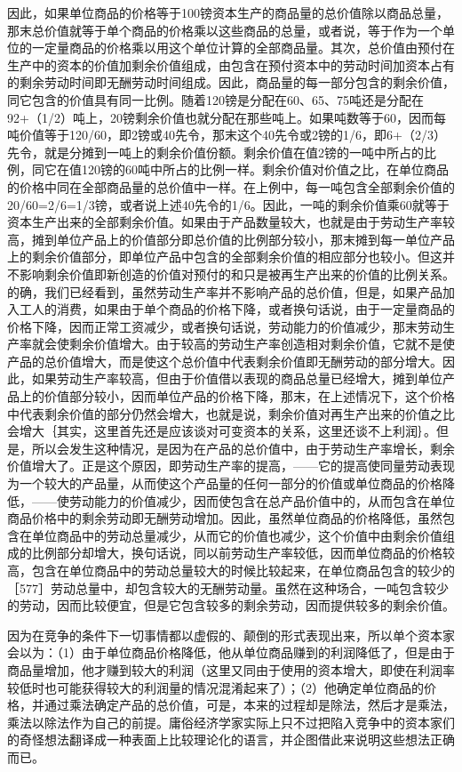 因此，如果单位商品的价格等于100镑资本生产的商品量的总价值除以商品总量，那末总价值就等于单个商品的价格乘以这些商品的总量，或者说，等于作为一个单位的一定量商品的价格乘以用这个单位计算的全部商品量。其次，总价值由预付在生产中的资本的价值加剩余价值组成，由包含在预付资本中的劳动时间加资本占有的剩余劳动时间即无酬劳动时间组成。因此，商品量的每一部分包含的剩余价值，同它包含的价值具有同一比例。随着120镑是分配在60、65、75吨还是分配在92+（1/2）吨上，20镑剩余价值也就分配在那些吨上。如果吨数等于60，因而每吨价值等于120/60，即2镑或40先令，那末这个40先令或2镑的1/6，即6+（2/3）先令，就是分摊到一吨上的剩余价值份额。剩余价值在值2镑的一吨中所占的比例，同它在值120镑的60吨中所占的比例一样。剩余价值对价值之比，在单位商品的价格中同在全部商品量的总价值中一样。在上例中，每一吨包含全部剩余价值的20/60=2/6=1/3镑，或者说上述40先令的1/6。因此，一吨的剩余价值乘60就等于资本生产出来的全部剩余价值。如果由于产品数量较大，也就是由于劳动生产率较高，摊到单位产品上的价值部分即总价值的比例部分较小，那末摊到每一单位产品上的剩余价值部分，即单位产品中包含的全部剩余价值的相应部分也较小。但这并不影响剩余价值即新创造的价值对预付的和只是被再生产出来的价值的比例关系。的确，我们已经看到，虽然劳动生产率并不影响产品的总价值，但是，如果产品加入工人的消费，如果由于单个商品的价格下降，或者换句话说，由于一定量商品的价格下降，因而正常工资减少，或者换句话说，劳动能力的价值减少，那末劳动生产率就会使剩余价值增大。由于较高的劳动生产率创造相对剩余价值，它就不是使产品的总价值增大，而是使这个总价值中代表剩余价值即无酬劳动的部分增大。因此，如果劳动生产率较高，但由于价值借以表现的商品总量已经增大，摊到单位产品上的价值部分较小，因而单位产品的价格下降，那末，在上述情况下，这个价格中代表剩余价值的部分仍然会增大，也就是说，剩余价值对再生产出来的价值之比会增大｛其实，这里首先还是应该谈对可变资本的关系，这里还谈不上利润｝。但是，所以会发生这种情况，是因为在产品的总价值中，由于劳动生产率增长，剩余价值增大了。正是这个原因，即劳动生产率的提高，——它的提高使同量劳动表现为一个较大的产品量，从而使这个产品量的任何一部分的价值或单位商品的价格降低，——使劳动能力的价值减少，因而使包含在总产品价值中的，从而包含在单位商品价格中的剩余劳动即无酬劳动增加。因此，虽然单位商品的价格降低，虽然包含在单位商品中的劳动总量减少，从而它的价值也减少，这个价值中由剩余价值组成的比例部分却增大，换句话说，同以前劳动生产率较低，因而单位商品的价格较高，包含在单位商品中的劳动总量较大的时候比较起来，在单位商品包含的较少的［577］劳动总量中，却包含较大的无酬劳动量。虽然在这种场合，一吨包含较少的劳动，因而比较便宜，但是它包含较多的剩余劳动，因而提供较多的剩余价值。

因为在竞争的条件下一切事情都以虚假的、颠倒的形式表现出来，所以单个资本家会以为：（1）由于单位商品价格降低，他从单位商品赚到的利润降低了，但是由于商品量增加，他才赚到较大的利润（这里又同由于使用的资本增大，即使在利润率较低时也可能获得较大的利润量的情况混淆起来了）；（2）他确定单位商品的价格，并通过乘法确定产品的总价值，可是，本来的过程却是除法，然后才是乘法，乘法以除法作为自己的前提。庸俗经济学家实际上只不过把陷入竞争中的资本家们的奇怪想法翻译成一种表面上比较理论化的语言，并企图借此来说明这些想法正确而已。

